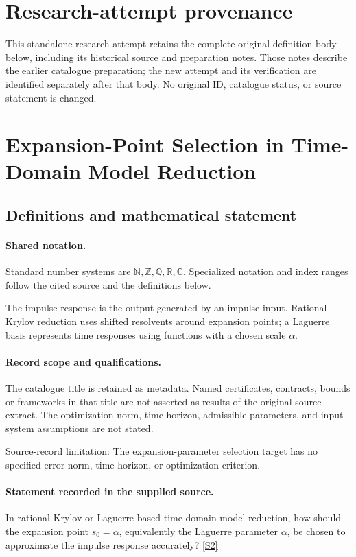 \documentclass[11pt]{article}
\begin{document}
\section*{Research-attempt provenance}
This standalone research attempt retains the complete original definition body below,
including its historical source and preparation notes. Those notes describe the
earlier catalogue preparation; the new attempt and its verification are identified
separately after that body. No original ID, catalogue status, or source statement is changed.

\section{Expansion-Point Selection in Time-Domain Model Reduction}\label{statement}

\subsection{Definitions and mathematical statement}

\paragraph{Shared notation.}Standard number systems are $\mathbb N,\mathbb Z,\mathbb Q,\mathbb R,\mathbb C$. Specialized notation and index ranges follow the cited source and the definitions below.


The impulse response is the output generated by an impulse input. Rational Krylov reduction uses shifted resolvents around expansion points; a Laguerre basis represents time responses using functions with a chosen scale $\alpha$.
\paragraph{Record scope and qualifications.}
The catalogue title is retained as metadata. Named certificates, contracts, bounds or frameworks in that title are not asserted as results of the original source extract.
The optimization norm, time horizon, admissible parameters, and input-system assumptions are not stated.

Source-record limitation: The expansion-parameter selection target has no specified error norm, time horizon, or optimization criterion.
\paragraph{Statement recorded in the supplied source.}
In rational Krylov or Laguerre-based time-domain model reduction, how should the expansion point $s_0=\alpha$, equivalently the Laguerre parameter $\alpha$, be chosen to approximate the impulse response accurately? \href{https://doi.org/10.4171/owr/2009/11}{[S2]}
\end{document}
